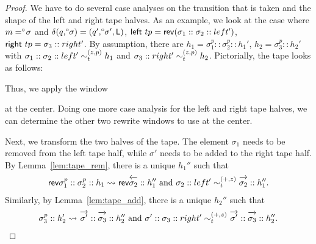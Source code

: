 \begin{proof}
  We have to do several case analyses on the transition that is taken and the shape of the left and right tape halves. As an example, we look at the case where $m = \degree\kern-0.5ex\sigma$ and $\delta(q, \degree\kern-0.5ex\sigma) = (q', \degree\kern-0.5ex\sigma', \textsf{L})$, $\textsf{left}~tp = \mathsf{rev}{(\sigma_1 :: \sigma_2 :: left')}$, $\textsf{right}~tp = \sigma_3 :: right'$. 
  By assumption, there are $h_1 = \sigma_1^{p} :: \sigma_2^{p} :: h_1'$, $h_2 = \sigma_3^p :: h_2'$ with $\sigma_1 :: \sigma_2 :: left' \sim_t^{(z, p)} h_1$ and $\sigma_3 :: right' \sim_t^{(z, p)} h_2$. 
  Pictorially, the tape looks as follows:
  \begin{center}
  \end{center}
  Thus, we apply the window 
  \begin{center}
  \end{center}
  at the center.
  Doing one more case analysis for the left and right tape halves, we can determine the other two rewrite windows to use at the center.

  Next, we transform the two halves of the tape. The element $\sigma_1$ needs to be removed from the left tape half, while $\sigma'$ needs to be added to the right tape half. 
  By Lemma~\ref{lem:tape_rem}, there is a unique $h_1''$ such that 
  \begin{align*}
    \rev{\sigma_1^p :: \sigma_2^p :: h_1} \strent{} \rev{\polneg{\sigma_2} :: h_1''} \text{ and } \sigma_2 :: left' \reprtt{+}{z} \polpos{\sigma_2} :: h_1''. 
  \end{align*}
  Similarly, by Lemma~\ref{lem:tape_add}, there is a unique $h_2''$ such that
  \begin{align*}
    \sigma_3^p :: h_2' \strent{} \polpos{\sigma'} :: \polpos{\sigma_3} :: h_2'' \text{ and } \sigma' :: \sigma_3 :: right' \reprtt{+}{z} \polpos{\sigma'} :: \polpos{\sigma_3} :: h_2''. 
  \end{align*}


\end{proof}
